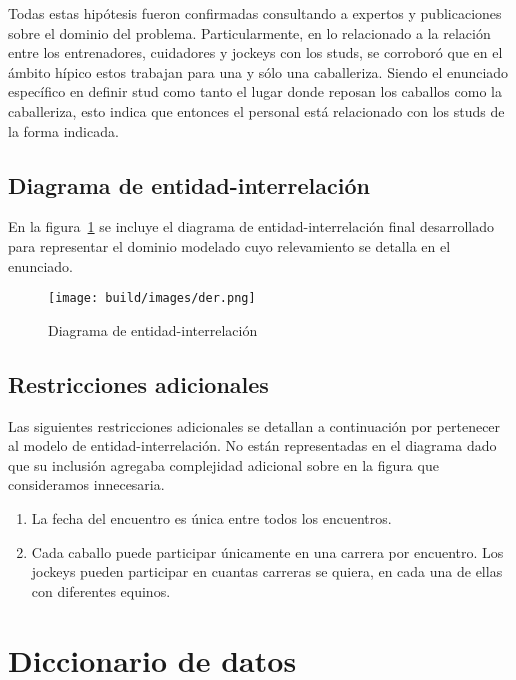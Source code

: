 \documentclass[a4paper,11pt]{article}
\begin{document}
Todas estas hipótesis fueron confirmadas consultando a expertos y publicaciones
sobre el dominio del problema. Particularmente, en lo relacionado a la relación
entre los entrenadores, cuidadores y jockeys con los studs, se corroboró que en
el ámbito hípico estos trabajan para una y sólo una caballeriza. Siendo el
enunciado específico en definir stud como tanto el lugar donde reposan los
caballos como la caballeriza, esto indica que entonces el personal está
relacionado con los studs de la forma indicada.

\subsection{Diagrama de entidad-interrelación}

En la figura~\ref{fig:der} se incluye el diagrama de entidad-interrelación
final desarrollado para representar el dominio modelado cuyo relevamiento se
detalla en el enunciado.

\begin{figure}[h!t]
  \centering
  \texttt{[image: build/images/der.png]}
  \caption{Diagrama de entidad-interrelación} \label{fig:der}
\end{figure}

\FloatBarrier

\subsection{Restricciones adicionales}

Las siguientes restricciones adicionales se detallan a continuación por
pertenecer al modelo de entidad-interrelación. No están representadas en el
diagrama dado que su inclusión agregaba complejidad adicional sobre en la
figura que consideramos innecesaria.

\begin{enumerate}

  \item La fecha del encuentro es única entre todos los encuentros.

  \item Cada caballo puede participar únicamente en una carrera por encuentro.
    Los jockeys pueden participar en cuantas carreras se quiera, en cada una de
    ellas con diferentes equinos.

\end{enumerate}

\section{Diccionario de datos}
\end{document}
